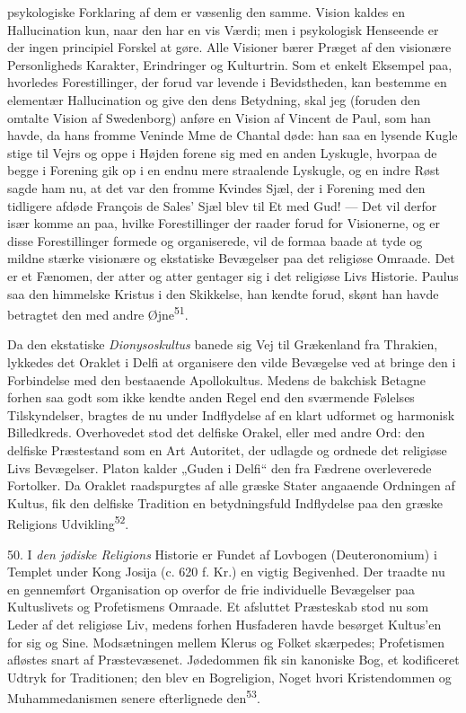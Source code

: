 \documentclass[12pt,a4paper,openany]{book}
\newcommand{\opage}[1]{\marginnote{\footnotesize\textit{[#1]}}}
\begin{document}
psykologiske Forklaring af dem er væsenlig den samme. Vision kaldes en
Hallucination kun, naar den har en vis Værdi; men i psykologisk
Henseende er der ingen principiel Forskel at gøre. Alle Visioner bærer
Præget af den visionære Personligheds Karakter, Erindringer og
Kulturtrin. Som et enkelt Eksempel paa, hvorledes Forestillinger, der
forud var levende i Bevidstheden, kan bestemme en elementær
Hallucination og give den dens Betydning, skal jeg (foruden den omtalte
Vision af Swedenborg) anføre en Vision af Vincent de Paul, som han
havde, da hans fromme Veninde Mme de Chantal døde: han saa en lysende
Kugle stige til Vejrs og oppe i Højden forene sig med en anden Lyskugle,
hvorpaa de begge i Forening gik op i en endnu mere straalende Lyskugle,
og en indre Røst sagde ham nu, at det var den fromme Kvindes Sjæl, der i
Forening med den tidligere afdøde François de Sales’ Sjæl blev til Et
med Gud! --- Det vil derfor især komme an paa, hvilke Forestillinger der
raader forud for Visionerne, og er disse Forestillinger formede og
organiserede, vil de formaa baade at tyde og mildne stærke visionære og
ekstatiske Bevægelser paa det religiøse Omraade. Det er et Fænomen, der
atter og atter gentager sig i det religiøse Livs Historie. Paulus saa
den himmelske Kristus i den Skikkelse, han kendte forud, skønt han havde
betragtet den med andre Øjne\textsuperscript{51}.

Da den ekstatiske \textit{Dionysoskultus} banede sig Vej til Grækenland
fra Thrakien, lykkedes det Oraklet i Delfi at organisere den vilde
Bevægelse ved at bringe den i Forbindelse med den bestaaende
Apollokultus. Medens de bakchisk Betagne forhen saa godt som ikke kendte
anden Regel end den sværmende Følelses Tilskyndelser, bragtes de nu
under Indflydelse af en klart udformet og harmonisk Billedkreds.
Overhovedet stod det delfiske Orakel, eller med andre Ord: den delfiske
Præstestand som en Art Autoritet, der udlagde og ordnede det religiøse
Livs Bevægelser. Platon kalder „Guden i Delfi“ den fra Fædrene
overleverede Fortolker. Da Oraklet raadspurgtes af alle græske Stater
angaaende Ordningen af Kultus, fik den delfiske Tradition en
betydningsfuld Indflydelse paa den græske Religions
Udvikling\textsuperscript{52}.

\opage{112}50. I \textit{den jødiske Religions} Historie er Fundet af
Lovbogen (Deuteronomium) i Templet under Kong Josija (c. 620 f. Kr.) en
vigtig Begivenhed. Der traadte nu en gennemført Organisation op overfor
de frie individuelle Bevægelser paa Kultuslivets og Profetismens
Omraade. Et afsluttet Præsteskab stod nu som Leder af det religiøse Liv,
medens forhen Husfaderen havde besørget Kultus’en for sig og Sine.
Modsætningen mellem Klerus og Folket skærpedes; Profetismen afløstes
snart af Præstevæsenet. Jødedommen fik sin kanoniske Bog, et kodificeret
Udtryk for Traditionen; den blev en Bogreligion, Noget hvori
Kristendommen og Muhammedanismen senere efterlignede
den\textsuperscript{53}.
\end{document}
